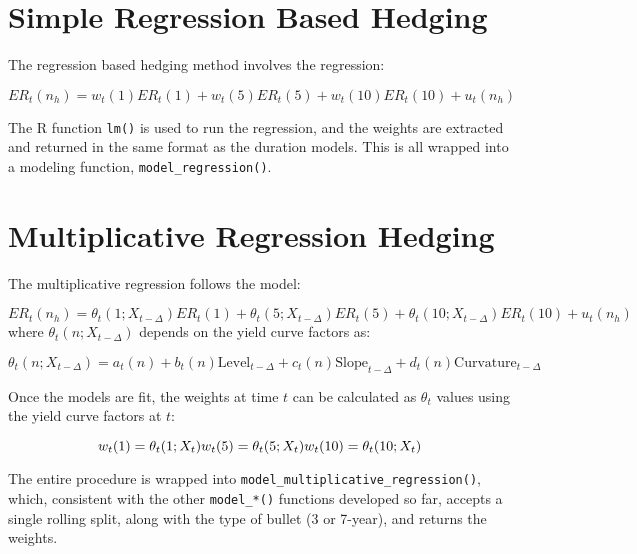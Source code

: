 \documentclass[openany]{book}
\theoremstyle{definition}
\theoremstyle{definition}
\theoremstyle{definition}
\theoremstyle{remark}
\begin{document}
\small

\normalsize

\hypertarget{simple-regression-based-hedging}{%
\section{Simple Regression Based
Hedging}\label{simple-regression-based-hedging}}

The regression based hedging method involves the regression:

\[ ER_t(n_h) = w_t(1) ER_t(1) + w_t(5) ER_t(5) + w_t(10) ER_t(10) + u_t(n_h) \]

The R function \texttt{lm()} is used to run the regression, and the
weights are extracted and returned in the same format as the duration
models. This is all wrapped into a modeling function,
\texttt{model\_regression()}.

\small

\normalsize

\hypertarget{multiplicative-regression-hedging}{%
\section{Multiplicative Regression
Hedging}\label{multiplicative-regression-hedging}}

The multiplicative regression follows the model:

\[ ER_t(n_h) = \theta_t(1; X_{t-\Delta}) ER_t(1) + \theta_t(5; X_{t-\Delta}) ER_t(5) + \theta_t(10; X_{t-\Delta}) ER_t(10) + u_t(n_h) \]
where \(\theta_t(n; X_{t-\Delta})\) depends on the yield curve factors
as:

\[ \theta_t(n; X_{t-\Delta}) = a_t(n) + b_t(n) \text{Level}_{t-\Delta} + c_t(n) \text{Slope}_{t-\Delta} + d_t(n) \text{Curvature}_{t-\Delta} \]

Once the models are fit, the weights at time \(t\) can be calculated as
\(\theta_t\) values using the yield curve factors at \(t\):

\[ 
w_t(1) = \theta_t(1; X_t) \\ 
w_t(5) = \theta_t(5; X_t) \\ 
w_t(10) = \theta_t(10; X_t)
\]

The entire procedure is wrapped into
\texttt{model\_multiplicative\_regression()}, which, consistent with the
other \texttt{model\_*()} functions developed so far, accepts a single
rolling split, along with the type of bullet (3 or 7-year), and returns
the weights.

\small
\end{document}
